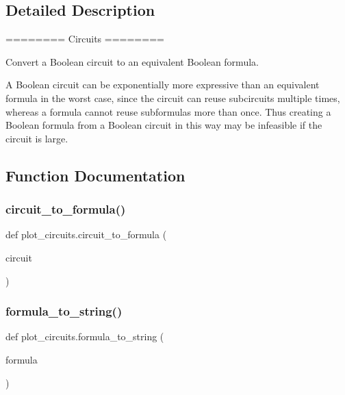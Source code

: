 \subsection{Detailed Description}
\begin{DoxyVerb}========
Circuits
========

Convert a Boolean circuit to an equivalent Boolean formula.

A Boolean circuit can be exponentially more expressive than an
equivalent formula in the worst case, since the circuit can reuse
subcircuits multiple times, whereas a formula cannot reuse subformulas
more than once. Thus creating a Boolean formula from a Boolean circuit
in this way may be infeasible if the circuit is large.\end{DoxyVerb}
 

\subsection{Function Documentation}
\mbox{\label{namespaceplot__circuits_a53ff938a8c813de2fbf36fded2c89f4a}} 
\subsubsection{\texorpdfstring{circuit\+\_\+to\+\_\+formula()}{circuit\_to\_formula()}}
{\footnotesize\ttfamily def plot\+\_\+circuits.\+circuit\+\_\+to\+\_\+formula (\begin{DoxyParamCaption}\item[{}]{circuit }\end{DoxyParamCaption})}

\mbox{\label{namespaceplot__circuits_aa31d102c9728092c504ee41aa71be59e}} 
\subsubsection{\texorpdfstring{formula\+\_\+to\+\_\+string()}{formula\_to\_string()}}
{\footnotesize\ttfamily def plot\+\_\+circuits.\+formula\+\_\+to\+\_\+string (\begin{DoxyParamCaption}\item[{}]{formula }\end{DoxyParamCaption})}



